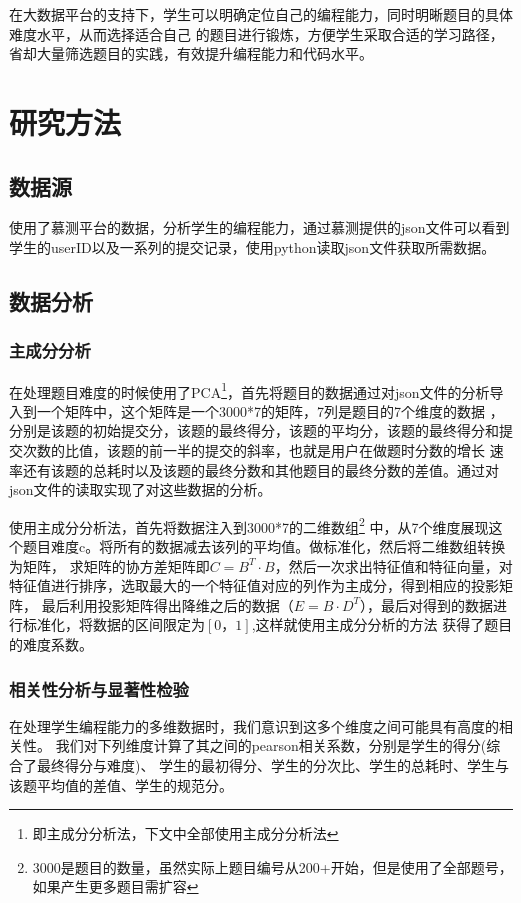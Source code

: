\documentclass[UTF8]{ctexart}
\begin{document}
在大数据平台的支持下，学生可以明确定位自己的编程能力，同时明晰题目的具体难度水平，从而选择适合自己
的题目进行锻炼，方便学生采取合适的学习路径，省却大量筛选题目的实践，有效提升编程能力和代码水平。
\section{研究方法}
\subsection{数据源}
使用了慕测平台的数据，分析学生的编程能力，通过慕测提供的json文件可以看到学生的userID以及一系列的提交记录，使用python读取json文件获取所需数据。
\subsection{数据分析}
\subsubsection{主成分分析}
在处理题目难度的时候使用了PCA\footnote{即主成分分析法，下文中全部使用主成分分析法}，首先将题目的数据通过对json文件的分析导入到一个矩阵中，这个矩阵是一个3000*7的矩阵，7列是题目的7个维度的数据
，分别是该题的初始提交分，该题的最终得分，该题的平均分，该题的最终得分和提交次数的比值，该题的前一半的提交的斜率，也就是用户在做题时分数的增长
速率还有该题的总耗时以及该题的最终分数和其他题目的最终分数的差值。通过对json文件的读取实现了对这些数据的分析。

使用主成分分析法，首先将数据注入到3000*7的二维数组\footnote{3000是题目的数量，虽然实际上题目编号从200+开始，但是使用了全部题号，如果产生更多题目需扩容}
中，从7个维度展现这个题目难度c。将所有的数据减去该列的平均值。做标准化，然后将二维数组转换为矩阵，
求矩阵的协方差矩阵即$C=B^T \cdot B$，然后一次求出特征值和特征向量，对特征值进行排序，选取最大的一个特征值对应的列作为主成分，得到相应的投影矩阵，
最后利用投影矩阵得出降维之后的数据（$E = B \cdot D^T$），最后对得到的数据进行标准化，将数据的区间限定为$[0，1]$,这样就使用主成分分析的方法
获得了题目的难度系数。
\subsubsection{相关性分析与显著性检验}
在处理学生编程能力的多维数据时，我们意识到这多个维度之间可能具有高度的相关性。
我们对下列维度计算了其之间的pearson相关系数，分别是学生的得分(综合了最终得分与难度)、
学生的最初得分、学生的分次比、学生的总耗时、学生与该题平均值的差值、学生的规范分。
\end{document}
